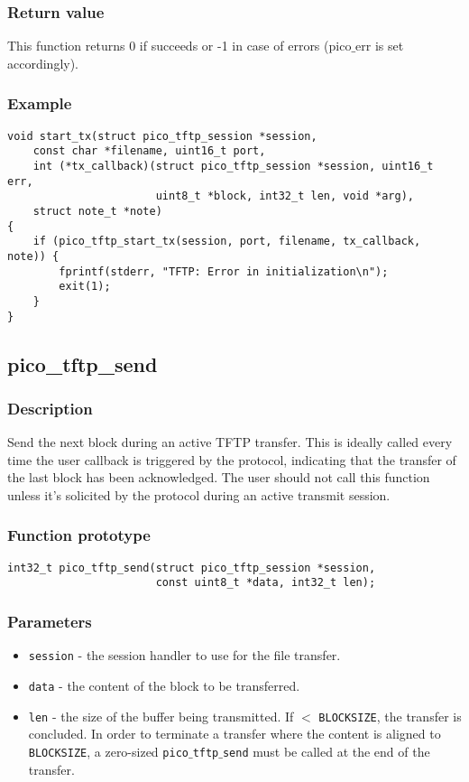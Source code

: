 \subsubsection*{Return value}
This function returns 0 if succeeds or -1 in case of errors (pico$\_$err is set accordingly).

\subsubsection*{Example}
\begin{verbatim}
void start_tx(struct pico_tftp_session *session,
    const char *filename, uint16_t port,
    int (*tx_callback)(struct pico_tftp_session *session, uint16_t err,
                       uint8_t *block, int32_t len, void *arg),
    struct note_t *note)
{
    if (pico_tftp_start_tx(session, port, filename, tx_callback, note)) {
        fprintf(stderr, "TFTP: Error in initialization\n");
        exit(1);
    }
}
\end{verbatim}


\subsection{pico\_tftp\_send}
\subsubsection*{Description}
Send the next block during an active TFTP transfer. This is ideally called every time the user callback is triggered by the protocol, indicating that the transfer of the last block has been acknowledged. The user should not call this function unless it's solicited by the protocol during an active transmit session.

\subsubsection*{Function prototype}
\begin{verbatim}
int32_t pico_tftp_send(struct pico_tftp_session *session,
                       const uint8_t *data, int32_t len);
\end{verbatim}

\subsubsection*{Parameters}
\begin{itemize}[noitemsep]
\item \texttt{session} - the session handler to use for the file transfer.
\item \texttt{data} - the content of the block to be transferred.
\item \texttt{len} - the size of the buffer being transmitted. If $<$ \texttt{BLOCKSIZE}, the transfer is concluded. In order to terminate a transfer where the content is aligned to \texttt{BLOCKSIZE}, a zero-sized \texttt{pico$\_$tftp$\_$send} must be called at the end of the transfer.
\end{itemize}

